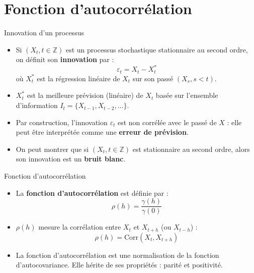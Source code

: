 \documentclass[11pt,aspectratio=169]{beamer}
\newcommand{\Corr}{\mathrm{Corr}}
\newcommand{\Z}{\mathbb{Z}}
\begin{document}
\section{Fonction d'autocorrélation}

\begin{frame}{Innovation d'un processus}

\begin{itemize}

\item Si $(X_t, t \in \Z)$ est un processus stochastique stationnaire au second ordre, on définit son \textbf{innovation} par :
  \[
  \varepsilon_t = X_t - X_t^*
  \]
  où $X_t^*$ est la régression linéaire de $X_t$ sur son passé $(X_s, s < t)$.\newline

\item $X_t^*$ est la meilleure prévision (linéaire) de $X_t$ basée sur l'ensemble d'information $I_t = \{X_{t-1}, X_{t-2}, \ldots\}$.\newline

\item Par construction, l'innovation $\varepsilon_t$ est non corrélée avec le passé de $X$ : elle peut être interprétée comme une \textbf{erreur de prévision}.\newline

\item On peut montrer que si $(X_t, t \in \Z)$ est stationnaire au second ordre, alors son innovation est un \textbf{bruit blanc}.

\end{itemize}

\end{frame}

\begin{frame}{Fonction d'autocorrélation}

\begin{itemize}

\item La \textbf{fonction d'autocorrélation} est définie par :
  \[
  \rho(h) = \frac{\gamma(h)}{\gamma(0)}
  \]\newline

\item $\rho(h)$ mesure la corrélation entre $X_t$ et $X_{t+h}$ (ou $X_{t-h}$) :
  \[
  \rho(h) = \Corr(X_t, X_{t+h})
  \]\newline

\item La fonction d'autocorrélation est une normalisation de la fonction d'autocovariance. Elle hérite de ses propriétés : parité et positivité.

\end{itemize}

\end{frame}
\end{document}
